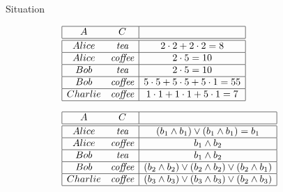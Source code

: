 \documentclass[11pt]{beamer}
\begin{document}
\begin{frame}{Situation}
\begin{tiny}
\begin{figure}
\centering
\begin{subfigure}{0.5\textwidth}
$\begin{array}{| c  c  | c |}
            \hline
            A & C & \\
            \hline 
            \hline
            Alice & \textit{tea} & 2 \cdot 2 + 2 \cdot 2 = 8\\
            \hline
            Alice & \textit{coffee} & 2 \cdot 5 = 10 \\
            \hline
            Bob & \textit{tea} & 2 \cdot 5 = 10 \\
            \hline
            Bob & \textit{coffee} & 5 \cdot 5 + 5 \cdot 5 + 5 \cdot 1 = 55 \\
            \hline
            Charlie & \textit{coffee} & 1 \cdot 1 + 1 \cdot 1 + 5 \cdot 1 = 7 \\
            \hline
           \end{array}$
\end{subfigure}
\begin{subfigure}{0.5\textwidth}
$\begin{array}{| c  c  | c |}
            \hline
            A & C & \\
            \hline 
            \hline
            Alice & \textit{tea} & (b_1 \wedge b_1) \vee (b_1 \wedge b_1) = b_1\\
            \hline
            Alice & \textit{coffee} & b_1 \wedge b_2 \\
            \hline
            Bob & \textit{tea} & b_1 \wedge b_2 \\
            \hline
            Bob & \textit{coffee} & (b_2 \wedge b_2) \vee (b_2 \wedge b_2) \vee (b_2 \wedge b_1)  \\
            \hline
            Charlie & \textit{coffee} & (b_3 \wedge b_3) \vee (b_3 \wedge b_3) \vee (b_2 \wedge b_3) \\
            \hline
           \end{array}$
\end{subfigure}
\end{figure}
\end{tiny}
\end{frame}
\end{document}

